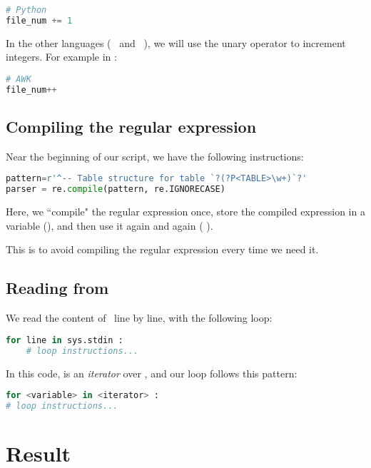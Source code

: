 \begin{lstlisting}[language=python]
# Python
file_num += 1
\end{lstlisting}

\medskip


In the other languages ( \awk\ and \perl\ ), we will use the \cmd{++} unary operator to increment integers. For example in \awk:

\begin{lstlisting}[language=awk]
# AWK
file_num++ 
\end{lstlisting}



\subsection*{Compiling the regular expression}

Near the beginning of our script, we have the following instructions:

\begin{lstlisting}[language=python]
pattern=r'^-- Table structure for table `?(?P<TABLE>\w+)`?'
parser = re.compile(pattern, re.IGNORECASE)
\end{lstlisting}

Here, we ``compile" the regular expression once, store the compiled expression in a variable (), and then use it again and again (  ).

This is to avoid compiling the regular expression every time we need it.

\subsection*{Reading from \stdin\ }

We read the content of \stdin\ line by line, with the following loop:
\begin{lstlisting}[language=python]
	for line in sys.stdin :
	# loop instructions...
\end{lstlisting}

In this code,  is an \emph{iterator} over \stdin, and our loop follows this pattern:
\begin{lstlisting}[language=python]
for <variable> in <iterator> :
# loop instructions...
\end{lstlisting}


\newpage

\section*{Result} 


